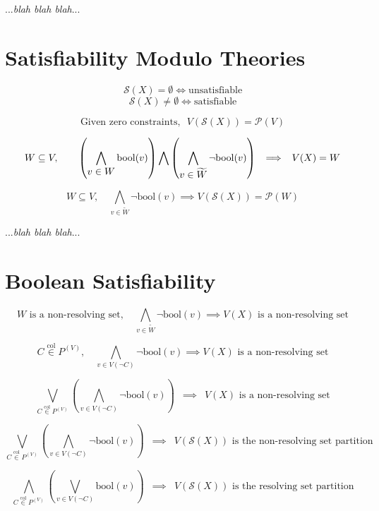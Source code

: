 \documentclass{article}
\newcommand{\combine}[7]{#1 #2 \vphantom{#6} #3 #4 #5 #6 \vphantom{#2} #7}
\begin{document}
	...\textit{blah blah blah}...

	\clearpage
	\section{Satisfiability Modulo Theories}

	\[ \mathcal{S}(X) = \emptyset \iff \text{unsatisfiable} \]
	\[ \mathcal{S}(X) \neq \emptyset \iff \text{satisfiable} \]

	\[ \text{Given zero constraints},\enspace V(\mathcal{S}(X)) = \mathcal{P}(V) \]

	\[ W \subseteq V,\qquad \combine{\left(}{\bigwedge \limits_{\displaystyle v \in W} \mathrm{bool}(v)}{\right)}{\bigwedge}{\left(}{\bigwedge \limits_{\displaystyle v \in \widetilde{W}} \neg \mathrm{bool}(v)}{\right)}\enspace \implies\enspace V(X) = W \]

	\[ W \subseteq V,\quad \bigwedge \limits_{\displaystyle v \in \widetilde{W}} \neg \mathrm{bool}(v) \implies V(\mathcal{S}(X)) = \mathcal{P}(W) \]

	...\textit{blah blah blah}...

	\clearpage
	\section{Boolean Satisfiability}

	\[ W \text{ is a non-resolving set},\quad \bigwedge \limits_{\displaystyle v \in \widetilde{W}} \neg \mathrm{bool}(v) \implies V(X) \text{ is a non-resolving set} \]

	\[ C \overset{\mathrm{col}}{\in} P^{(V)},\quad \bigwedge \limits_{\displaystyle v \in V(\neg C)} \neg \mathrm{bool}(v) \implies V(X) \text{ is a non-resolving set} \]

	\[ \bigvee \limits_{\displaystyle C \overset{\mathrm{col}}{\in} P^{(V)}} \left( \bigwedge \limits_{\displaystyle v \in V(\neg C)} \neg \mathrm{bool}(v) \right)\enspace \implies\enspace V(X) \text{ is a non-resolving set} \]

	\[ \bigvee \limits_{\displaystyle C \overset{\mathrm{col}}{\in} P^{(V)}} \left( \bigwedge \limits_{\displaystyle v \in V(\neg C)} \neg \mathrm{bool}(v) \right)\enspace \implies\enspace V(\mathcal{S}(X)) \text{ is the non-resolving set partition} \]

	\[ \bigwedge \limits_{\displaystyle C \overset{\mathrm{col}}{\in} P^{(V)}} \left( \bigvee \limits_{\displaystyle v \in V(\neg C)} \mathrm{bool}(v) \right)\enspace \implies\enspace V(\mathcal{S}(X)) \text{ is the resolving set partition} \]
\end{document}
